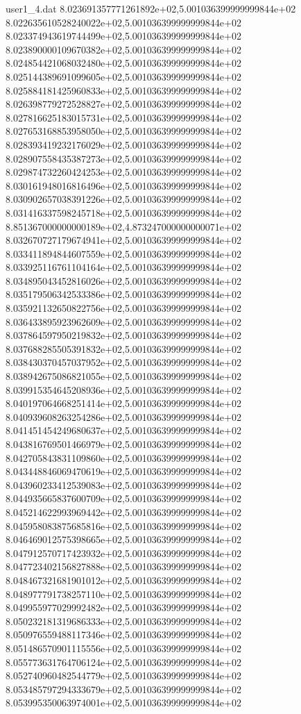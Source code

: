 \begin{filecontents}{user1_4.dat}
8.023691357771261892e+02,5.001036399999999844e+02
8.022635610528240022e+02,5.001036399999999844e+02
8.023374943619744499e+02,5.001036399999999844e+02
8.023890000109670382e+02,5.001036399999999844e+02
8.024854421068032480e+02,5.001036399999999844e+02
8.025144389691099605e+02,5.001036399999999844e+02
8.025884181425960833e+02,5.001036399999999844e+02
8.026398779272528827e+02,5.001036399999999844e+02
8.027816625183015731e+02,5.001036399999999844e+02
8.027653168853958050e+02,5.001036399999999844e+02
8.028393419232176029e+02,5.001036399999999844e+02
8.028907558435387273e+02,5.001036399999999844e+02
8.029874732260424253e+02,5.001036399999999844e+02
8.030161948016816496e+02,5.001036399999999844e+02
8.030902657038391226e+02,5.001036399999999844e+02
8.031416337598245718e+02,5.001036399999999844e+02
8.851367000000000189e+02,4.873247000000000071e+02
8.032670727179674941e+02,5.001036399999999844e+02
8.033411894844607559e+02,5.001036399999999844e+02
8.033925116761104164e+02,5.001036399999999844e+02
8.034895043452816026e+02,5.001036399999999844e+02
8.035179506342533386e+02,5.001036399999999844e+02
8.035921132650822756e+02,5.001036399999999844e+02
8.036433895923962609e+02,5.001036399999999844e+02
8.037864597950219832e+02,5.001036399999999844e+02
8.037688285505391832e+02,5.001036399999999844e+02
8.038430370457037952e+02,5.001036399999999844e+02
8.038942675086821055e+02,5.001036399999999844e+02
8.039915354645208936e+02,5.001036399999999844e+02
8.040197064668251414e+02,5.001036399999999844e+02
8.040939608263254286e+02,5.001036399999999844e+02
8.041451454249680637e+02,5.001036399999999844e+02
8.043816769501466979e+02,5.001036399999999844e+02
8.042705843831109860e+02,5.001036399999999844e+02
8.043448846069470619e+02,5.001036399999999844e+02
8.043960233412539083e+02,5.001036399999999844e+02
8.044935665837600709e+02,5.001036399999999844e+02
8.045214622993969442e+02,5.001036399999999844e+02
8.045958083875685816e+02,5.001036399999999844e+02
8.046469012575398665e+02,5.001036399999999844e+02
8.047912570717423932e+02,5.001036399999999844e+02
8.047723402156827888e+02,5.001036399999999844e+02
8.048467321681901012e+02,5.001036399999999844e+02
8.048977791738257110e+02,5.001036399999999844e+02
8.049955977029992482e+02,5.001036399999999844e+02
8.050232181319686333e+02,5.001036399999999844e+02
8.050976559488117346e+02,5.001036399999999844e+02
8.051486570901115556e+02,5.001036399999999844e+02
8.055773631764706124e+02,5.001036399999999844e+02
8.052740960482544779e+02,5.001036399999999844e+02
8.053485797294333679e+02,5.001036399999999844e+02
8.053995350063974001e+02,5.001036399999999844e+02

\end{filecontents}
